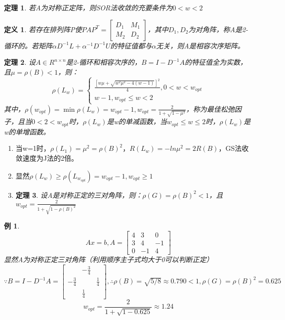 \documentclass[a4paper]{article}
\newtheorem{definition}{定义}[section]
\newtheorem{theorem}{定理}[section]
\newtheorem{example}{例}[section]
\begin{document}
\begin{theorem}
  若A为对称正定阵，则SOR法收敛的充要条件为$0<w<2$
\end{theorem}

\begin{definition}
  若存在排列阵P使$PAP^T=\left[\begin{matrix}
    D_1 & M_1 \\
    M_2 & D_2
  \end{matrix}\right]$，其中$D_1, D_2$为对角阵，称A是2-循环的。若矩阵$\alpha D^{-1}L+\alpha^{-1}D^{-1}U $的特征值都与$\alpha$无关，则A是相容次序矩阵。
\end{definition}

\begin{theorem}
  设$A\in R^{n\times n} $是2-循环和相容次序的，$B=I-D^{-1}A $的特征值全为实数，且$\mu=\rho(B)<1$，则：
  \begin{equation*}
    \rho(L_w)=
    \left\{
      \begin{array}{lr}
        \frac{[w\mu+\sqrt{w^2\mu^2-4(w-1)}]^2}{4}, 0<w<w_{opt} \\
        w-1, w_{opt}\le w < 2
      \end{array}
      \right.
  \end{equation*}
  其中，$\rho(w_{opt})=\min\rho(L_w)=w_{opt}-1, w_{opt}=\frac{2}{1+\sqrt{1-\mu^2}} $，称为最佳松弛因子，且当$0<2<w_{opt}$时，$\rho(L_w)$是w的单减函数，当$w_{opt}\le w\le 2$时，$\rho(L_w)$是w的单增函数。

\end{theorem}

\begin{enumerate}
  \item 当w=1时，$\rho(L_1)=\mu^2=\rho(B)^2$，$R(L_w)=-ln\mu^2=2R(B)$，GS法收敛速度为J法的2倍。
  \item 显然$\rho(L_w)\ge \rho(L_{w_{opt}})=w_{opt}-1, w_{opt}\ge 1 $
  \item \begin{theorem}
    设A是对称正定的三对角阵，则：$\rho(G)=\rho(B)^2<1$，且$w_{opt}=\frac{2}{1+\sqrt{1-\rho(B)^2}} $
  \end{theorem}
\end{enumerate}

\begin{example}
  $$Ax=b, A=\left[\begin{matrix}
    4 & 3 & 0 \\
    3 & 4 & -1 \\
    0 & -1 & 4
  \end{matrix}
    \right]$$
    显然A为对称正定三对角阵（利用顺序主子式均大于0可以判断正定） \\
    $\because B=I-D^{-1}A =\left[\begin{matrix}
      & -\frac{3}{4} \\
      -\frac{3}{4} & & \frac{1}{4} \\
      & \frac{1}{4} 
    \end{matrix}\right], \therefore \rho(B)=\sqrt{5/8}\approx 0.790 < 1,\rho(G)=\rho(B)^2=0.625$ \\
    $$w_{opt}=\frac{2}{1+\sqrt{1-0.625}}\approx 1.24$$
\end{example}
\end{document}

